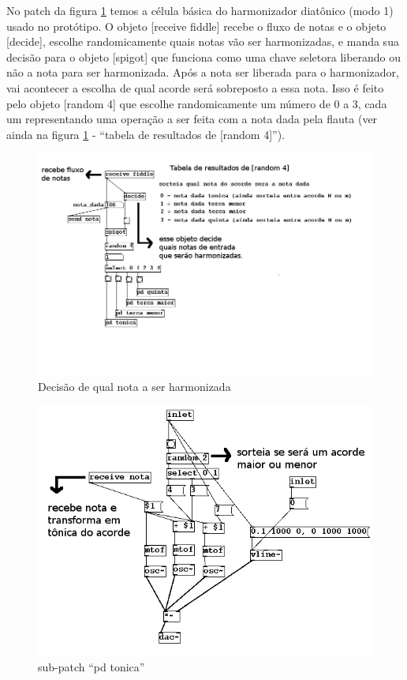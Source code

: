 \documentclass{ppgmus}
\begin{document}
No patch da figura \ref{harm1}  temos a célula básica do harmonizador diatônico (modo 1)
 usado no protótipo. 
O objeto [receive fiddle] recebe o fluxo de notas e o objeto [decide], escolhe 
randomicamente quais notas vão ser harmonizadas, e manda sua decisão para o objeto 
[spigot] que funciona como uma chave seletora liberando ou não a nota para ser harmonizada. 
Após a nota ser liberada para o harmonizador, vai acontecer  a escolha de qual acorde será 
sobreposto a essa nota. Isso é feito pelo objeto [random 4] que escolhe randomicamente um 
número de 0 a 3, cada um representando uma operação a ser feita com a nota dada pela flauta 
(ver ainda na figura \ref{harm1} - ``tabela de resultados de [random 4]'').

\begin{figure}[!ht]
\includegraphics[scale=.6]{harm1}
\caption{Decisão de qual nota a ser harmonizada}
\label{harm1}
\end{figure}

\begin{figure}[!ht]
\includegraphics[scale=.6]{harm2}
\caption{sub-patch ``pd tonica''}
\label{harm2}
\end{figure}
\end{document}
